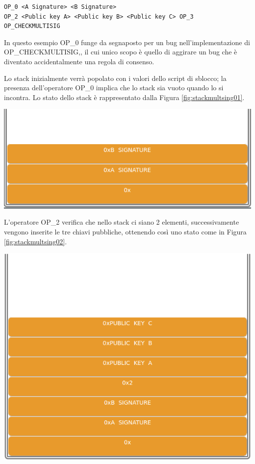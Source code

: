 \begin{lstlisting}[language=bitcoinscript, caption={Script P2MS completo}]
OP_0 <A Signature> <B Signature>
OP_2 <Public key A> <Public key B> <Public key C> OP_3 OP_CHECKMULTISIG
\end{lstlisting}
In questo esempio OP\_0 funge da segnaposto per un bug nell’implementazione di OP\_CHE\-CK\-MULTI\-SIG,, il cui unico scopo è quello di aggirare un bug che è diventato accidentalmente una regola di consenso.

Lo stack inizialmente verrà popolato con i valori dello script di sblocco; la presenza dell’operatore OP\_0 implica che lo stack sia vuoto quando lo si incontra. Lo stato dello stack è rappresentato dalla Figura \ref{fig:stackmultsing01}.

{\centering
\vspace{15pt}
\includegraphics[scale=0.35]{images/script/multisig/1.png}
\vspace{10pt}
\par}

L’operatore OP\_2 verifica che nello stack ci siano 2 elementi, successivamente vengono inserite le tre chiavi pubbliche, ottenendo così uno stato come in Figura \ref{fig:stackmultsing02}.

{\centering
\vspace{15pt}
\includegraphics[scale=0.35]{images/script/multisig/2.png}
\vspace{10pt}
\par}


